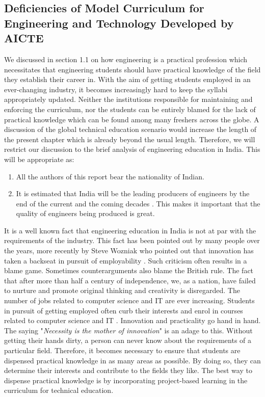 \subsection{Deficiencies of Model Curriculum for Engineering and Technology Developed by AICTE}
We discussed in section 1.1 on how engineering is a practical profession which necessitates that engineering students should have practical knowledge of the field they establish their career in. With the aim of getting students employed in an ever-changing industry, it becomes increasingly hard to keep the syllabi appropriately updated. Neither the institutions responsible for maintaining and enforcing the curriculum, nor the students can be entirely blamed for the lack of practical knowledge which can be found among many freshers across the globe. A discussion of the global technical education scenario would increase the length of the present chapter which is already beyond the usual length. Therefore, we will restrict our discussion to the brief analysis of engineering education in India. This will be appropriate as:
\begin{enumerate}
\item All the authors of this report bear the nationality of Indian.
\item It is estimated that India will be the leading producers of engineers by the end of the current and the coming decades \cite{ind2015eng}. This makes it important that the quality of engineers being produced is great.
\end{enumerate}
It is a well known fact that engineering education in India is not at par with the requirements of the industry. This fact has been pointed out by many people over the years, more recently by Steve Wozniak who pointed out that innovation has taken a backseat in pursuit of employability \cite{woz2018eng}. Such criticism often results in a blame game. Sometimes counterarguments also blame the British rule. The fact that after more than half a century of independence, we, as a nation, have failed to nurture and promote original thinking and creativity is disregarded. The number of jobs related to computer science and IT are ever increasing. Students in pursuit of getting employed often curb their interests and enrol in courses related to computer science and IT \cite{popengtoi}. Innovation and practicality go hand in hand. The saying "\textit{Necessity is the mother of innovation}" is an adage to this. Without getting their hands dirty, a person can never know about the requirements of a particular field. Therefore, it becomes necessary to ensure that students are dispensed practical knowledge in as many areas as possible. By doing so, they can determine their interests and contribute to the fields they like. The best way to dispense practical knowledge is by incorporating project-based learning in the curriculum for technical education.\\
